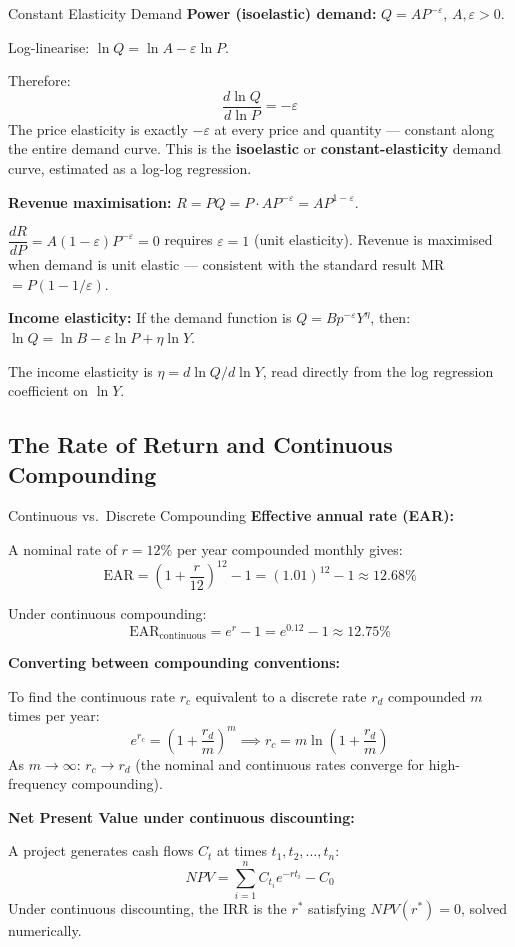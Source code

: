 \documentclass[12pt, a4paper]{article}
\theoremstyle{definition}
\newcommand{\ddd}[2]{\dfrac{d#1}{d#2}}
\begin{document}
\begin{exbox}{Constant Elasticity Demand}
\textbf{Power (isoelastic) demand:} $Q = AP^{-\varepsilon}$, $A, \varepsilon > 0$.

Log-linearise: $\ln Q = \ln A - \varepsilon\ln P$.

Therefore:
\[
  \ddd{\ln Q}{\ln P} = -\varepsilon
\]
The price elasticity is exactly $-\varepsilon$ at every price and quantity --- constant along the entire demand curve. This is the \textbf{isoelastic} or \textbf{constant-elasticity} demand curve, estimated as a log-log regression.

\textbf{Revenue maximisation:} $R = PQ = P\cdot AP^{-\varepsilon} = AP^{1-\varepsilon}$.

$\ddd{R}{P} = A(1-\varepsilon)P^{-\varepsilon} = 0$ requires $\varepsilon = 1$ (unit elasticity). Revenue is maximised when demand is unit elastic --- consistent with the standard result MR $= P(1-1/\varepsilon)$.

\textbf{Income elasticity:} If the demand function is $Q = Bp^{-\varepsilon}Y^{\eta}$, then:
$\ln Q = \ln B - \varepsilon\ln P + \eta\ln Y$.

The income elasticity is $\eta = d\ln Q/d\ln Y$, read directly from the log regression coefficient on $\ln Y$.
\end{exbox}

\subsection{The Rate of Return and Continuous Compounding}

\begin{exbox}{Continuous vs.\ Discrete Compounding}
\textbf{Effective annual rate (EAR):}

A nominal rate of $r=12\%$ per year compounded monthly gives:
\[
  \text{EAR} = \left(1+\frac{r}{12}\right)^{12}-1 = (1.01)^{12}-1 \approx 12.68\%
\]

Under continuous compounding:
\[
  \text{EAR}_{\text{continuous}} = e^r - 1 = e^{0.12}-1 \approx 12.75\%
\]

\textbf{Converting between compounding conventions:}

To find the continuous rate $r_c$ equivalent to a discrete rate $r_d$ compounded $m$ times per year:
\[
  e^{r_c} = \left(1+\frac{r_d}{m}\right)^m
  \implies r_c = m\ln\!\left(1+\frac{r_d}{m}\right)
\]
As $m\to\infty$: $r_c \to r_d$ (the nominal and continuous rates converge for high-frequency compounding).

\textbf{Net Present Value under continuous discounting:}

A project generates cash flows $C_t$ at times $t_1, t_2, \ldots, t_n$:
\[
  NPV = \sum_{i=1}^n C_{t_i} e^{-rt_i} - C_0
\]
Under continuous discounting, the IRR is the $r^*$ satisfying $NPV(r^*)=0$, solved numerically.
\end{exbox}
\end{document}
